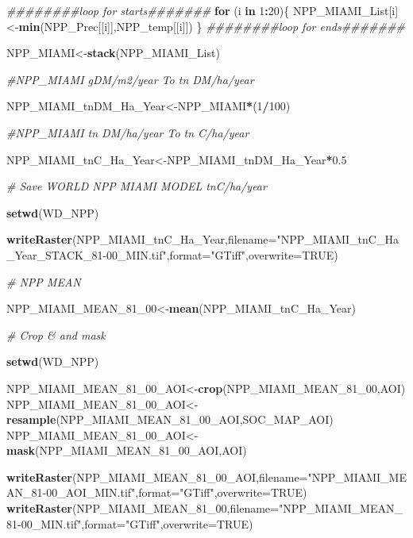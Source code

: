 \documentclass[
  10pt,
  b5paper,
]{book}
\newenvironment{Shaded}{\begin{snugshade}}{\end{snugshade}}
\newcommand{\CommentTok}[1]{\textcolor[rgb]{0.56,0.35,0.01}{\textit{#1}}}
\newcommand{\ControlFlowTok}[1]{\textcolor[rgb]{0.13,0.29,0.53}{\textbf{#1}}}
\newcommand{\DataTypeTok}[1]{\textcolor[rgb]{0.13,0.29,0.53}{#1}}
\newcommand{\DecValTok}[1]{\textcolor[rgb]{0.00,0.00,0.81}{#1}}
\newcommand{\FloatTok}[1]{\textcolor[rgb]{0.00,0.00,0.81}{#1}}
\newcommand{\KeywordTok}[1]{\textcolor[rgb]{0.13,0.29,0.53}{\textbf{#1}}}
\newcommand{\NormalTok}[1]{#1}
\newcommand{\OperatorTok}[1]{\textcolor[rgb]{0.81,0.36,0.00}{\textbf{#1}}}
\newcommand{\OtherTok}[1]{\textcolor[rgb]{0.56,0.35,0.01}{#1}}
\newcommand{\StringTok}[1]{\textcolor[rgb]{0.31,0.60,0.02}{#1}}
\begin{document}
\begin{Shaded}
\begin{Highlighting}[]
\CommentTok{########loop for starts#######}
\ControlFlowTok{for}\NormalTok{ (i }\ControlFlowTok{in} \DecValTok{1}\OperatorTok{:}\DecValTok{20}\NormalTok{)\{}
\NormalTok{NPP_MIAMI_List[i]<-}\KeywordTok{min}\NormalTok{(NPP_Prec[[i]],NPP_temp[[i]])}
\NormalTok{\}}
\CommentTok{########loop for ends#######}

\NormalTok{NPP_MIAMI<-}\KeywordTok{stack}\NormalTok{(NPP_MIAMI_List)}

\CommentTok{#NPP_MIAMI gDM/m2/year To tn DM/ha/year}

\NormalTok{NPP_MIAMI_tnDM_Ha_Year<-NPP_MIAMI}\OperatorTok{*}\NormalTok{(}\DecValTok{1}\OperatorTok{/}\DecValTok{100}\NormalTok{)}

\CommentTok{#NPP_MIAMI tn DM/ha/year To tn C/ha/year}

\NormalTok{NPP_MIAMI_tnC_Ha_Year<-NPP_MIAMI_tnDM_Ha_Year}\OperatorTok{*}\FloatTok{0.5}

\CommentTok{# Save WORLD NPP MIAMI MODEL tnC/ha/year}

\KeywordTok{setwd}\NormalTok{(WD_NPP)}

\KeywordTok{writeRaster}\NormalTok{(NPP_MIAMI_tnC_Ha_Year,}\DataTypeTok{filename=}\StringTok{"NPP_MIAMI_tnC_Ha_Year_STACK_81-00_MIN.tif"}\NormalTok{,}\DataTypeTok{format=}\StringTok{"GTiff"}\NormalTok{,}\DataTypeTok{overwrite=}\OtherTok{TRUE}\NormalTok{)}

\CommentTok{# NPP MEAN}

\NormalTok{NPP_MIAMI_MEAN_}\DecValTok{81}\NormalTok{_}\DecValTok{00}\NormalTok{<-}\KeywordTok{mean}\NormalTok{(NPP_MIAMI_tnC_Ha_Year)}

\CommentTok{# Crop & and mask}

\KeywordTok{setwd}\NormalTok{(WD_NPP)}

\NormalTok{NPP_MIAMI_MEAN_}\DecValTok{81}\NormalTok{_}\DecValTok{00}\NormalTok{_AOI<-}\KeywordTok{crop}\NormalTok{(NPP_MIAMI_MEAN_}\DecValTok{81}\NormalTok{_}\DecValTok{00}\NormalTok{,AOI)}
\NormalTok{NPP_MIAMI_MEAN_}\DecValTok{81}\NormalTok{_}\DecValTok{00}\NormalTok{_AOI<-}\KeywordTok{resample}\NormalTok{(NPP_MIAMI_MEAN_}\DecValTok{81}\NormalTok{_}\DecValTok{00}\NormalTok{_AOI,SOC_MAP_AOI)}
\NormalTok{NPP_MIAMI_MEAN_}\DecValTok{81}\NormalTok{_}\DecValTok{00}\NormalTok{_AOI<-}\KeywordTok{mask}\NormalTok{(NPP_MIAMI_MEAN_}\DecValTok{81}\NormalTok{_}\DecValTok{00}\NormalTok{_AOI,AOI)}

\KeywordTok{writeRaster}\NormalTok{(NPP_MIAMI_MEAN_}\DecValTok{81}\NormalTok{_}\DecValTok{00}\NormalTok{_AOI,}\DataTypeTok{filename=}\StringTok{"NPP_MIAMI_MEAN_81-00_AOI_MIN.tif"}\NormalTok{,}\DataTypeTok{format=}\StringTok{"GTiff"}\NormalTok{,}\DataTypeTok{overwrite=}\OtherTok{TRUE}\NormalTok{)}
\KeywordTok{writeRaster}\NormalTok{(NPP_MIAMI_MEAN_}\DecValTok{81}\NormalTok{_}\DecValTok{00}\NormalTok{,}\DataTypeTok{filename=}\StringTok{"NPP_MIAMI_MEAN_81-00_MIN.tif"}\NormalTok{,}\DataTypeTok{format=}\StringTok{"GTiff"}\NormalTok{,}\DataTypeTok{overwrite=}\OtherTok{TRUE}\NormalTok{)}



\end{Highlighting}
\end{Shaded}
\end{document}
